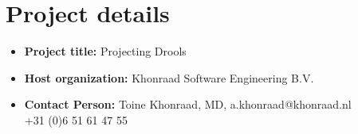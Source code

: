 
\section*{Project details}
\begin{itemize}
    \item \textbf{Project title:} Projecting Drools
    \item \textbf{Host organization:} Khonraad Software Engineering B.V.
    \item \textbf{Contact Person:} Toine Khonraad, MD, a.khonraad@khonraad.nl\\ +31 (0)6 51 61 47 55
\end{itemize}